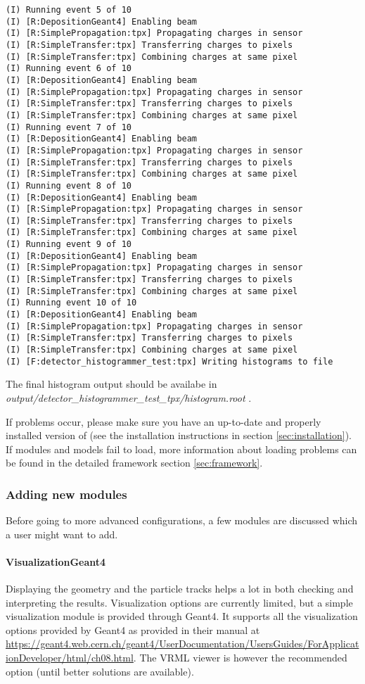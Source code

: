 \begin{lstlisting}[breaklines]
(I) Running event 5 of 10
(I) [R:DepositionGeant4] Enabling beam
(I) [R:SimplePropagation:tpx] Propagating charges in sensor
(I) [R:SimpleTransfer:tpx] Transferring charges to pixels
(I) [R:SimpleTransfer:tpx] Combining charges at same pixel
(I) Running event 6 of 10
(I) [R:DepositionGeant4] Enabling beam
(I) [R:SimplePropagation:tpx] Propagating charges in sensor
(I) [R:SimpleTransfer:tpx] Transferring charges to pixels
(I) [R:SimpleTransfer:tpx] Combining charges at same pixel
(I) Running event 7 of 10
(I) [R:DepositionGeant4] Enabling beam
(I) [R:SimplePropagation:tpx] Propagating charges in sensor
(I) [R:SimpleTransfer:tpx] Transferring charges to pixels
(I) [R:SimpleTransfer:tpx] Combining charges at same pixel
(I) Running event 8 of 10
(I) [R:DepositionGeant4] Enabling beam
(I) [R:SimplePropagation:tpx] Propagating charges in sensor
(I) [R:SimpleTransfer:tpx] Transferring charges to pixels
(I) [R:SimpleTransfer:tpx] Combining charges at same pixel
(I) Running event 9 of 10
(I) [R:DepositionGeant4] Enabling beam
(I) [R:SimplePropagation:tpx] Propagating charges in sensor
(I) [R:SimpleTransfer:tpx] Transferring charges to pixels
(I) [R:SimpleTransfer:tpx] Combining charges at same pixel
(I) Running event 10 of 10
(I) [R:DepositionGeant4] Enabling beam
(I) [R:SimplePropagation:tpx] Propagating charges in sensor
(I) [R:SimpleTransfer:tpx] Transferring charges to pixels
(I) [R:SimpleTransfer:tpx] Combining charges at same pixel
(I) [F:detector_histogrammer_test:tpx] Writing histograms to file
\end{lstlisting}
The final histogram output should be availabe in \\ \textit{output/detector\_histogrammer\_test\_tpx/histogram.root} .

If problems occur, please make sure you have an up-to-date and properly installed version of \apsq (see the installation instructions in section \ref{sec:installation}). If modules and models fail to load, more information about loading problems can be found in the detailed framework section \ref{sec:framework}.

\subsubsection{Adding new modules}
Before going to more advanced configurations, a few modules are discussed which a user might want to add.

\paragraph{VisualizationGeant4}
Displaying the geometry and the particle tracks helps a lot in both checking and interpreting the results. Visualization options are currently limited, but a simple visualization module is provided through Geant4. It supports all the visualization options provided by Geant4 as provided in their manual at \url{https://geant4.web.cern.ch/geant4/UserDocumentation/UsersGuides/ForApplicationDeveloper/html/ch08.html}. The VRML viewer is however the recommended option (until better solutions are available). 

